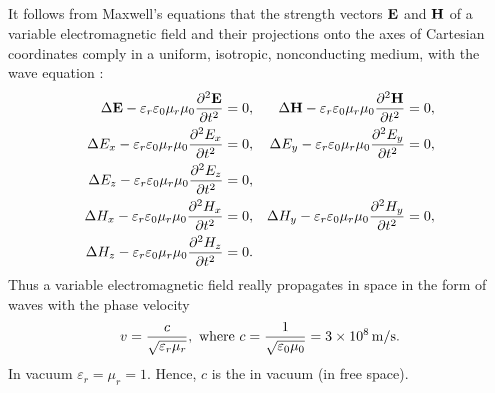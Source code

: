 \subsection{}\label{31.1.3} It follows from Maxwell's equations  that the
strength vectors $\vb{E}$ and $\vb{H}$ of a variable electromagnetic field and their projections onto the axes of Cartesian coordinates comply in a uniform, isotropic, nonconducting medium, with the wave equation :
\[
\begin{alignedat}{2}
\Delta \vb{E} - \varepsilon_{r} \varepsilon_{0}\mu_{r} \mu_{0} \pdv[2]{\vb{E}}{t} & = 0, &  \quad \Delta \vb{H} - \varepsilon_{r} \varepsilon_{0}\mu_{r} \mu_{0} \pdv[2]{\vb{H}}{t} & = 0,\\
\Delta E_{x} - \varepsilon_{r} \varepsilon_{0}\mu_{r} \mu_{0} \pdv[2]{E_{x}}{t} & = 0, & \quad  \Delta E_{y} - \varepsilon_{r} \varepsilon_{0}\mu_{r} \mu_{0} \pdv[2]{E_{y}}{t} & = 0,\\
\Delta E_{z} - \varepsilon_{r} \varepsilon_{0}\mu_{r} \mu_{0} \pdv[2]{E_{z}}{t} & = 0, & \quad \\
\Delta H_{x} - \varepsilon_{r} \varepsilon_{0}\mu_{r} \mu_{0} \pdv[2]{H_{x}}{t} & = 0, & \quad  \Delta H_{y} - \varepsilon_{r} \varepsilon_{0}\mu_{r} \mu_{0} \pdv[2]{H_{y}}{t} & = 0,\\
\Delta H_{z} - \varepsilon_{r} \varepsilon_{0}\mu_{r} \mu_{0} \pdv[2]{H_{z}}{t} & = 0.
\end{alignedat}
\]
Thus a variable electromagnetic field really propagates in space
in the form of waves with the phase velocity
\begin{equation*}%
v = \frac{c}{\sqrt{\varepsilon_{r} \mu_{r}}}, \,\, \text{where} \,\, c =\frac{1}{\sqrt{\varepsilon_{0} \mu_{0}}} = \SI{3d8}{\meter\per\second}.
\end{equation*}
In vacuum $\varepsilon_{r} = \mu_{r} = 1$. Hence, $c$ is the  in vacuum (in free space).

